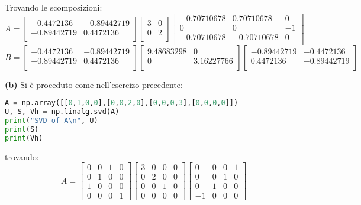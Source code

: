 \documentclass{article}
\begin{document}
Trovando le scomposizioni:
\[
A = 
\begin{bmatrix}
    -0.4472136 & -0.89442719 \\
    -0.89442719 & 0.4472136 \\
\end{bmatrix}
\begin{bmatrix}
    3 & 0 \\
    0 & 2 \\
\end{bmatrix}
\begin{bmatrix}
    -0.70710678 & 0.70710678 & 0 \\
    0 & 0 & -1 \\
    -0.70710678 & -0.70710678& 0 \\
\end{bmatrix}
\]
\[
B = 
\begin{bmatrix}
    -0.4472136 & -0.89442719 \\
    -0.89442719 & 0.4472136 \\
\end{bmatrix}
\begin{bmatrix}
    9.48683298 & 0 \\
    0 & 3.16227766 \\
\end{bmatrix}
\begin{bmatrix}
    -0.89442719 & -0.4472136 \\
    0.4472136 & -0.89442719 \\
\end{bmatrix}
\]


\textbf{(b)}
Si è proceduto come nell'esercizo precedente:
\begin{lstlisting}[language = Python]
A = np.array([[0,1,0,0],[0,0,2,0],[0,0,0,3],[0,0,0,0]])
U, S, Vh = np.linalg.svd(A)
print("SVD of A\n", U)
print(S)
print(Vh)
\end{lstlisting}
trovando:\[
A = 
\begin{bmatrix}
0 & 0 & 1 & 0 \\
0 & 1 & 0 & 0 \\
1 & 0 & 0 & 0 \\
0 & 0 & 0 & 1
\end{bmatrix}
\begin{bmatrix}
3 & 0 & 0 & 0 \\
0 & 2 & 0 & 0 \\
0 & 0 & 1 & 0 \\
0 & 0 & 0 & 0
\end{bmatrix}
\begin{bmatrix}
0 & 0 & 0 & 1 \\
0 & 0 & 1 & 0 \\
0 & 1 & 0 & 0 \\
-1 & 0 & 0 & 0
\end{bmatrix}
\]
\end{document}
